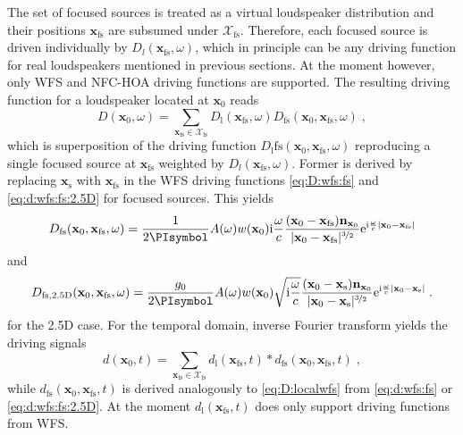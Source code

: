 \documentclass[a4paper]{book}
\newcommand{\PI}{\PIsymbol}%
\newcommand{\I}{\mathrm{i}}                          %
\newcommand{\E}{\mathrm{e}}                          %
\renewcommand{\vec}[1]{\mathbf{#1}}                  %
\newcommand{\x}{\vec{x}}                             %
\newcommand{\xs}{\x_\text{s}}                        %
\newcommand{\xfs}{\x_\text{fs}}                       %
\newcommand{\n}{\vec{n}}                             %
\newcommand{\omegac}{\frac{\omega}{c}}               %
\newcommand{\qc}{\;,}                                             %
\newcommand{\qp}{\;.}                                             %
\newcommand\eqlabel[2][]{%
  \label{eq:#2}%
}
\begin{document}
The set of focused sources is treated as a virtual loudspeaker 
distribution and their positions \(\xfs\) are subsumed under 
\(\mathcal{X}_{\mathrm{fs}}\). Therefore, each focused source is driven 
individually by 
\(D_l(\xfs, \omega)\), which in principle can be any driving function for real 
loudspeakers mentioned in previous sections. At the moment however, only 
WFS and NFC-HOA driving functions are supported. The resulting 
driving function for a loudspeaker located at \(\x_0\) reads
%
\begin{equation}
  D(\x_0,\omega) = \sum_{\xfs \in \mathcal{X}_{\mathrm{fs}}} 
  D_{\mathrm l}(\xfs, \omega) 
  D_{\mathrm{fs}}(\x_0,\xfs,\omega) \qc
  \eqlabel{D:localwfs}
\end{equation}
%
which is superposition of the driving function 
\(D_{\mathrm l}{\mathrm{fs}}(\x_0,\xfs,\omega)\) reproducing a single 
focused source at \(\xfs\) weighted by \(D_l(\xfs, \omega)\). Former is 
derived by replacing \(\xs\) with 
\(\xfs\) in the WFS driving functions \eqref{eq:D:wfs:fs} and 
\eqref{eq:d:wfs:fs:2.5D} for focused sources. This yields
%
\begin{equation}
  D_{\mathrm{fs}}(\x_0,\xfs,\omega) =
    \frac{1}{2\PI} A(\omega) w(\x_0) \I\omegac
    \frac{(\x_0-\xfs)\n_{\x_0}}{|\x_0-\xfs|^{\nicefrac{3}{2}}}
    \E^{\I\omegac |\x_0-\xfs|}
\end{equation}
%
and
%
\begin{equation}
  D_{\mathrm{fs,2.5D}}(\x_0,\xfs,\omega) = 
    \frac{g_0}{2\PI} A(\omega) w(\x_0) \sqrt{\I\omegac}
    \frac{(\x_0-\xs)\n_{\x_0}}{|\x_0-\xs|^{\nicefrac{3}{2}}}
    \E^{\I\omegac |\x_0-\xs|} \qp
\end{equation}
for the 2.5D case. For the temporal domain, inverse Fourier transform yields 
the driving signals
%
\begin{equation}
  d(\x_0,t) = \sum_{\xfs \in \mathcal{X}_{\mathrm{fs}}} 
    d_{\mathrm l}(\xfs, t) * d_{\mathrm{fs}}(\x_0,\xfs, t) \qc
  \eqlabel{d:localwfs}
\end{equation}
%
while \(d_{\mathrm{fs}}(\x_0,\xfs, t)\) is derived analogously to
\eqref{eq:D:localwfs} from \eqref{eq:d:wfs:fs} or \eqref{eq:d:wfs:fs:2.5D}. At 
the moment \(d_{\mathrm l}(\xfs, t)\) does only support driving functions from 
WFS.

\printglossary[title=Formula reference mapping]

\printbibliography
\end{document}
